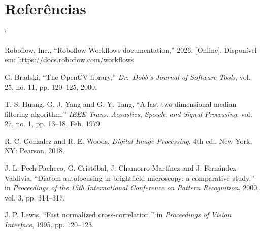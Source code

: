 \documentclass[10pt,twocolumn,letterpaper]{article}
\makeatletter
\renewcommand\@biblabel[1]{[#1]}
\renewenvironment{thebibliography}[1]
  {\section{Referências}\footnotesize
   \list{\@biblabel{\@arabic\c@enumiv}}%
        {\settowidth\labelwidth{\@biblabel{#1}}\leftmargin\labelwidth
         \advance\leftmargin\labelsep\usecounter{enumiv}%
         \let\p@enumiv\@empty\renewcommand\theenumiv{\@arabic\c@enumiv}%
         \itemsep 2pt}%
   \sloppy\sfcode`\.\@m}
  {\endlist}
\makeatother
\begin{document}
\begin{thebibliography}{9}

Roboflow, Inc., ``Roboflow Workflows documentation,'' 2026. [Online].
Disponível em: \url{https://docs.roboflow.com/workflows}

G. Bradski, ``The OpenCV library,'' \textit{Dr.\ Dobb's Journal of Software
Tools}, vol. 25, no. 11, pp. 120--125, 2000.

T. S. Huang, G. J. Yang and G. Y. Tang, ``A fast two-dimensional median
filtering algorithm,'' \textit{IEEE Trans. Acoustics, Speech, and Signal
Processing}, vol. 27, no. 1, pp. 13--18, Feb. 1979.

R. C. Gonzalez and R. E. Woods, \textit{Digital Image Processing}, 4th ed.,
New York, NY: Pearson, 2018.

J. L. Pech-Pacheco, G. Cristóbal, J. Chamorro-Martínez and J.
Fernández-Valdivia, ``Diatom autofocusing in brightfield microscopy: a
comparative study,'' in \textit{Proceedings of the 15th International
Conference on Pattern Recognition}, 2000, vol. 3, pp. 314--317.

J. P. Lewis, ``Fast normalized cross-correlation,'' in \textit{Proceedings of
Vision Interface}, 1995, pp. 120--123.

\end{thebibliography}
\end{document}
